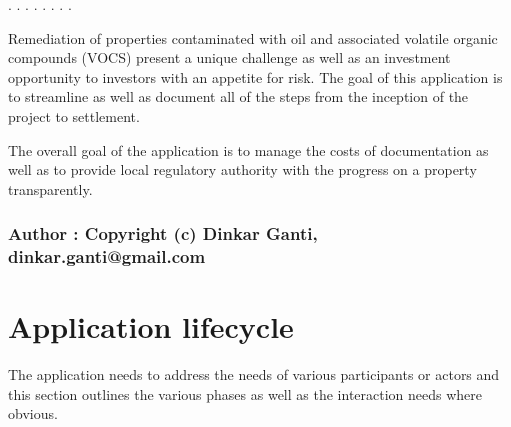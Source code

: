 \documentclass[12pt]{report}
\begin{document}

\begin{coqdoccode}
\coqdocemptyline
\coqdocnoindent
{}     .\coqdoceol
\coqdocnoindent
{}  .\coqdoceol
\coqdocnoindent
{}  .\coqdoceol
\coqdocnoindent
{}  .\coqdoceol
\coqdocnoindent
{}    .\coqdoceol
\coqdocnoindent
{}.\coqdoceol
\coqdocnoindent
{}  .\coqdoceol
\coqdocnoindent
{}   .\coqdoceol
\coqdocemptyline
\end{coqdoccode}
 Remediation of properties contaminated with oil and associated volatile organic 
 compounds (VOCS) present a unique challenge as well as an investment opportunity to 
 investors with an appetite for risk. The goal of this application is to streamline as well as 
 document all of the steps from the inception of the project to settlement. 


 The overall goal of the application is to manage the costs of documentation as well as to provide
  local regulatory authority with the progress on a property transparently. 
\subsubsection{Author : Copyright (c) Dinkar Ganti, dinkar.ganti@gmail.com}




\section{Application lifecycle}

 The application needs to address the needs of various participants or actors and this section 
outlines the various phases as well as the interaction needs where obvious. 
\end{document}
